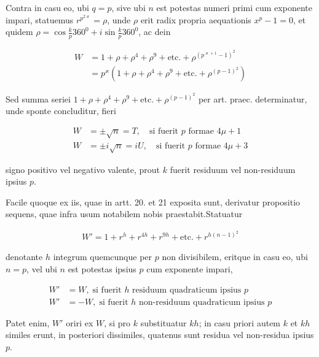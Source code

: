 Contra in casu eo, ubi $q=p$, sive ubi $n$ est potestas numeri primi cum exponente impari, statuemus $r^{p^{2\varkappa}}=\rho$, unde $\rho$ erit radix propria aequationis $x^p-1=0$, et quidem $\rho=\cos\frac{k}{p}360^0+i\sin\frac{k}{p}360^0$, ac dein

\[
\begin{aligned}
W&=1+\rho+\rho^4+\rho^9+\text{etc.}+\rho^{(p^{\varkappa+1}-1)^2}\\&=p^\varkappa(1+\rho+\rho^4+\rho^9+\text{etc.}+\rho^{(p-1)^2})
\end{aligned}
\]

Sed summa seriei $1+\rho+\rho^4+\rho^9+\text{etc.}+\rho^{(p-1)^2}$ per art. praec. determinatur, unde sponte concluditur, fieri

\[
\begin{aligned}
W&=\pm\surd n=T,\quad\text{si fuerit }p\text{ formae }4\mu+1\\
W&=\pm i\surd n=iU,\quad\text{si fuerit }p\text{ formae }4\mu+3
\end{aligned}
\]

signo positivo vel negativo valente, prout $k$ fuerit residuum vel non-residuum ipsius $p$.


Facile quoque ex iis, quae in artt. 20. et 21 exposita sunt, derivatur propositio sequens, quae infra usum notabilem nobis praestabit.\quad Statuatur

\[
\begin{aligned}
W'=1+r^h+r^{4h}+r^{9h}+\text{etc.}+r^{h(n-1)^2}
\end{aligned}
\]

%
denotante $h$ integrum quemcunque per $p$ non divisibilem, eritque in casu eo, ubi $n=p$, vel ubi $n$ est potestas ipsius $p$ cum exponente impari,

\[
\begin{aligned}
W'&=W,\;\text{si fuerit }h\text{ residuum quadraticum ipsius }p\\
W'&=-W,\;\text{si fuerit }h\text{ non-residuum quadraticum ipsius }p
\end{aligned}
\]

Patet enim, $W'$ oriri ex $W$, si pro $k$ substituatur $kh$; in casu priori autem $k$ et $kh$ similes erunt, in posteriori dissimiles, quatenus sunt residua vel non-residua ipsius $p$.

